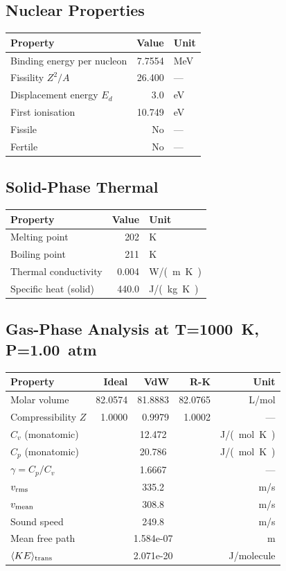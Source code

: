 \documentclass[11pt,a4paper]{article}
\begin{document}
\subsection{Nuclear Properties}
\begin{tabular}{lrl}
  \toprule
  Property & Value & Unit \\
  \midrule
  Binding energy per nucleon & 7.7554 & \si{MeV} \\
  Fissility $Z^2/A$ & 26.400 & --- \\
  Displacement energy $E_d$ & 3.0 & \si{eV} \\
  First ionisation & 10.749 & \si{eV} \\
  Fissile & No & --- \\
  Fertile & No & --- \\
  \bottomrule
\end{tabular}

\subsection{Solid-Phase Thermal}
\begin{tabular}{lrl}
  \toprule
  Property & Value & Unit \\
  \midrule
  Melting point & 202 & \si{K} \\
  Boiling point & 211 & \si{K} \\
  Thermal conductivity & 0.004 & \si{W/(m.K)} \\
  Specific heat (solid) & 440.0 & \si{J/(kg.K)} \\
  \bottomrule
\end{tabular}

\subsection{Gas-Phase Analysis at T=\SI{1000}{K}, P=\SI{1.00}{atm}}
\begin{tabular}{lrrrr}
  \toprule
  Property & Ideal & VdW & R-K & Unit \\
  \midrule
  Molar volume & 82.0574 & 81.8883 & 82.0765 & \si{L/mol} \\
  Compressibility $Z$ & 1.0000 & 0.9979 & 1.0002 & --- \\
  \midrule
  $C_v$ (monatomic) & \multicolumn{3}{c}{12.472} & \si{J/(mol.K)} \\
  $C_p$ (monatomic) & \multicolumn{3}{c}{20.786} & \si{J/(mol.K)} \\
  $\gamma = C_p/C_v$ & \multicolumn{3}{c}{1.6667} & --- \\
  $v_{\rm rms}$ & \multicolumn{3}{c}{335.2} & \si{m/s} \\
  $v_{\rm mean}$ & \multicolumn{3}{c}{308.8} & \si{m/s} \\
  Sound speed & \multicolumn{3}{c}{249.8} & \si{m/s} \\
  Mean free path & \multicolumn{3}{c}{1.584e-07} & \si{m} \\
  $\langle KE \rangle_{\rm trans}$ & \multicolumn{3}{c}{2.071e-20} & \si{J/molecule} \\
  \bottomrule
\end{tabular}
\end{document}
